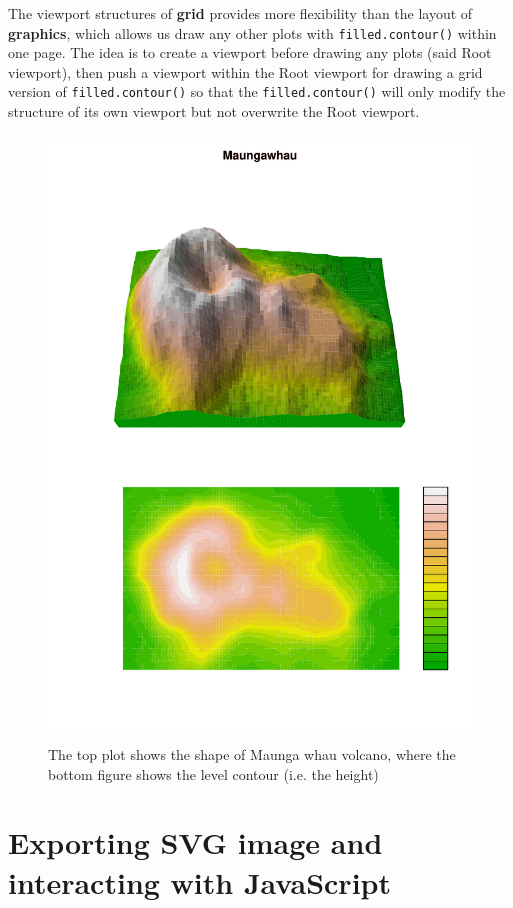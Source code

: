\documentclass[11pt]{report}
\begin{document}
The viewport structures of \textbf{grid} provides more flexibility than the layout of \textbf{graphics}, which allows us draw any other plots with \texttt{filled.contour()} within one page. The idea is to create a viewport before drawing any plots (said Root viewport), then push a viewport within the Root viewport for drawing a grid version of \texttt{filled.contour()} so that the \texttt{filled.contour()} will only modify the structure of its own viewport but not overwrite the Root viewport.\\
\begin{figure}[H]
	\begin{center}
		\includegraphics[height = 16cm, width = 12cm]{figure/Chapter6_example_3_1.pdf}
		\caption{The top plot shows the shape of Maunga whau volcano, where the bottom figure shows the level contour (i.e. the height)}
		\label{Example_6.2.1}
	\end{center}
\end{figure}


\newpage
\section{Exporting SVG image and interacting with JavaScript}
\end{document}
